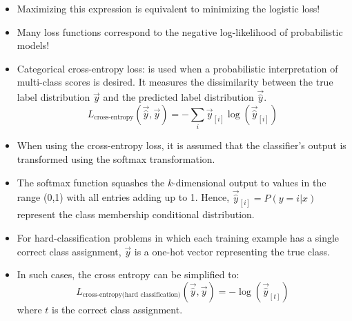 \begin{itemize}
\item Maximizing this expression is equivalent to minimizing the logistic loss!
 
\item Many loss functions correspond to the negative log-likelihood of probabilistic models!
\item Categorical cross-entropy loss:  is used when a probabilistic interpretation of multi-class scores is desired. It measures the dissimilarity between the true label distribution $\vec{y}$ and the predicted label distribution $\vec{\hat{y}}$. 
   \begin{displaymath}
  L_{\text{cross-entropy}}(\vec{\hat{y}},\vec{y}) = - \sum_{i} \vec{y}_{[i]} \log(\vec{\hat{y}}_{[i]})   
 \end{displaymath}
 \item When using the cross-entropy loss, it is assumed that the classifier's output is transformed using the softmax transformation.

 \item The softmax function squashes the $k$-dimensional output to values in the range (0,1) with all entries adding up to 1. Hence, $\vec{\hat{y}}_{[i]} = P( y = i |x)$ represent the class membership conditional distribution.
\item For hard-classification problems in which each training example has a single correct class assignment, $\vec{y}$ is a one-hot vector representing the true class. 
\item In such cases, the cross entropy can be simplified to:
   \begin{displaymath}
  L_{\text{cross-entropy(hard classification)}}(\vec{\hat{y}},\vec{y}) = -\log(\vec{\hat{y}}_{[t]})   
 \end{displaymath}
 where $t$ is the correct class assignment.
\end{itemize}



